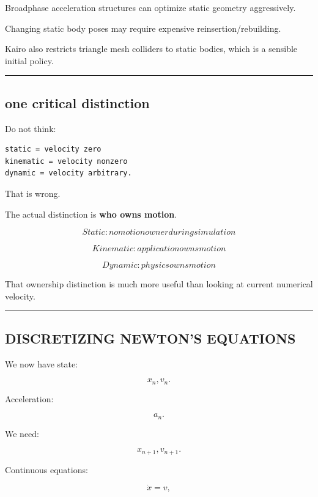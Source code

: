 Broadphase acceleration structures can optimize static geometry aggressively.

Changing static body poses may require expensive reinsertion/rebuilding.

Kairo also restricts triangle mesh colliders to static bodies, which is a sensible initial policy.

\begin{center}\rule{0.5\linewidth}{0.5pt}\end{center}

\subsection{one critical distinction}\label{06-engine-ii-ch037-one-critical-distinction}

Do not think:

\begin{verbatim}
static = velocity zero
kinematic = velocity nonzero
dynamic = velocity arbitrary.
\end{verbatim}

That is wrong.

The actual distinction is \textbf{who owns motion}.

\[
\boxed{
Static:
no motion owner during simulation
}
\]

\[
\boxed{
Kinematic:
application owns motion
}
\]

\[
\boxed{
Dynamic:
physics owns motion
}
\]

That ownership distinction is much more useful than looking at current numerical velocity.

\begin{center}\rule{0.5\linewidth}{0.5pt}\end{center}

\subsection{DISCRETIZING NEWTON'S EQUATIONS}\label{06-engine-ii-ch037-discretizing-newtons-equations}

We now have state:

\[
x_n,
v_n.
\]

Acceleration:

\[
a_n.
\]

We need:

\[
x_{n+1},
v_{n+1}.
\]

Continuous equations:

\[
\dot x=v,
\]

